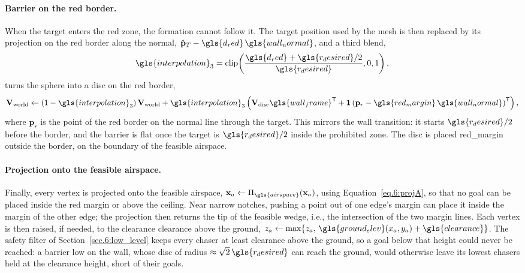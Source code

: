 \paragraph{Barrier on the red border.}
When the target enters the red zone, the formation cannot follow it. The target position used by the mesh is then replaced by its projection on the red border along the normal, $\hat{\mathbf{p}}_T-\gls{d_red}\,\gls{wall_normal}$, and a third blend,
\begin{equation}
    \gls{interpolation}_3=\operatorname{clip}\!\left(\frac{\gls{d_red}+\gls{r_desired}/2}{\gls{r_desired}},0,1\right),
    \label{eq.6:u3}
\end{equation}
turns the sphere into a disc on the red border,
\begin{equation}
    \mathbf{V}_{\mathrm{world}} \leftarrow (1-\gls{interpolation}_3)\,\mathbf{V}_{\mathrm{world}} + \gls{interpolation}_3\left(\mathbf{V}_{\mathrm{disc}}\gls{wall_frame}^{\mathsf T}+\mathbf{1}\left(\mathbf{p}_r-\gls{red_margin}\,\gls{wall_normal}\right)^{\mathsf T}\right),
    \label{eq.6:red_disc}
\end{equation}
where $\mathbf{p}_r$ is the point of the red border on the normal line through the target. This mirrors the wall transition: it starts $\gls{r_desired}/2$ before the border, and the barrier is flat once the target is $\gls{r_desired}/2$ inside the prohibited zone. The disc is placed \gls{red_margin} outside the border, on the boundary of the feasible airspace.

\paragraph{Projection onto the feasible airspace.}
Finally, every vertex is projected onto the feasible airspace, $\mathbf{x}_a\leftarrow\Pi_{\gls{airspace}}(\mathbf{x}_a)$, using Equation~\eqref{eq.6:projA}, so that no goal can be placed inside the red margin or above the ceiling. Near narrow notches, pushing a point out of one edge's margin can place it inside the margin of the other edge; the projection then returns the tip of the feasible wedge, i.e., the intersection of the two margin lines. Each vertex is then raised, if needed, to the clearance \gls{clearance} above the ground, $z_a\leftarrow\max\{z_a,\,\gls{ground_elev}(x_a,y_a)+\gls{clearance}\}$. The safety filter of Section~\ref{sec.6:low_level} keeps every chaser at least \gls{clearance} above the ground, so a goal below that height could never be reached: a barrier low on the wall, whose disc of radius $\approx\sqrt2\,\gls{r_desired}$ can reach the ground, would otherwise leave its lowest chasers held at the clearance height, short of their goals.

